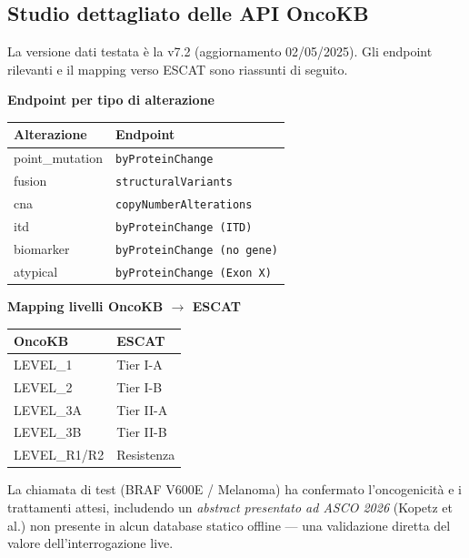 \documentclass[11pt,a4paper]{article}
\newcommand{\code}[1]{\texttt{\small #1}}
\begin{document}
\subsection{Studio dettagliato delle API OncoKB}
La versione dati testata \`e la v7.2 (aggiornamento 02/05/2025). Gli endpoint rilevanti e il mapping verso ESCAT sono riassunti di seguito.

\begin{center}
\small
\begin{minipage}[t]{0.52\textwidth}
\centering\sffamily\bfseries\color{primary}\footnotesize Endpoint per tipo di alterazione\\[3pt]
\begin{tabular}{@{}ll@{}}
\toprule
Alterazione & Endpoint \\
\midrule
point\_mutation & \code{byProteinChange} \\
fusion & \code{structuralVariants} \\
cna & \code{copyNumberAlterations} \\
itd & \code{byProteinChange (ITD)} \\
biomarker & \code{byProteinChange (no gene)} \\
atypical & \code{byProteinChange (Exon X)} \\
\bottomrule
\end{tabular}
\end{minipage}\hfill
\begin{minipage}[t]{0.44\textwidth}
\centering\sffamily\bfseries\color{primary}\footnotesize Mapping livelli OncoKB $\to$ ESCAT\\[3pt]
\begin{tabular}{@{}ll@{}}
\toprule
OncoKB & ESCAT \\
\midrule
LEVEL\_1 & Tier I-A \\
LEVEL\_2 & Tier I-B \\
LEVEL\_3A & Tier II-A \\
LEVEL\_3B & Tier II-B \\
LEVEL\_R1/R2 & Resistenza \\
\bottomrule
\end{tabular}
\end{minipage}
\end{center}

\noindent La chiamata di test (BRAF V600E / Melanoma) ha confermato l'oncogenicit\`a e i trattamenti attesi, includendo un \emph{abstract presentato ad ASCO 2026} (Kopetz et al.) non presente in alcun database statico offline --- una validazione diretta del valore dell'interrogazione live.
\end{document}
